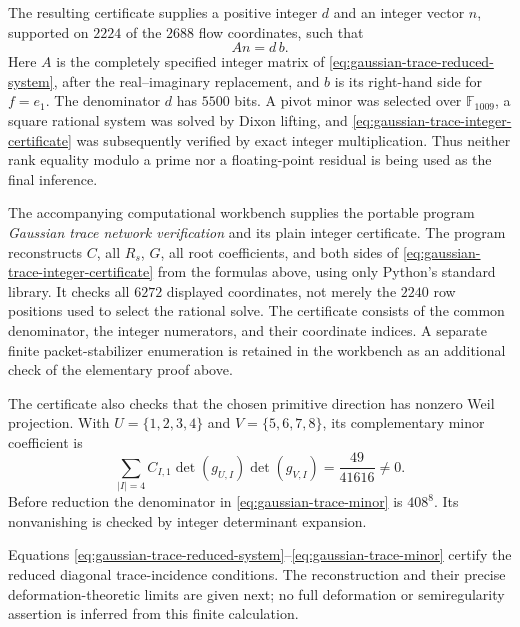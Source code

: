 The resulting certificate supplies a positive integer \(d\) and an integer
vector \(n\), supported on \(2224\) of the \(2688\) flow coordinates,
such that
\begin{equation}
 A n=d\,b.
 \label{eq:gaussian-trace-integer-certificate}
\end{equation}
Here \(A\) is the completely specified integer matrix of \eqref{eq:gaussian-trace-reduced-system}, after
the real--imaginary replacement, and \(b\) is its right-hand side for
\(f=e_1\).  The denominator \(d\) has \(5500\) bits.  A pivot minor
was selected over \(\mathbb F_{1009}\), a square rational system was
solved by Dixon lifting, and \eqref{eq:gaussian-trace-integer-certificate} was subsequently verified by exact
integer multiplication.  Thus neither rank equality modulo a prime
nor a floating-point residual is being used as the final inference.

The accompanying computational workbench supplies the portable
program \emph{Gaussian trace network verification} and its plain
integer certificate.  The program reconstructs \(C\),
all \(R_s\), \(G\), all root coefficients, and both sides of \eqref{eq:gaussian-trace-integer-certificate}
from the formulas above, using only Python's standard library.
It checks all \(6272\) displayed coordinates, not merely the
\(2240\) row positions used to select the rational solve.  The
certificate consists of the common denominator, the integer
numerators, and their coordinate indices.  A separate finite
packet-stabilizer enumeration is retained in the workbench as
an additional check of the elementary proof above.

The certificate also checks that the chosen primitive direction has
nonzero Weil projection.  With \(U=\{1,2,3,4\}\) and
\(V=\{5,6,7,8\}\), its complementary minor coefficient is
\begin{equation}
 \sum_{|I|=4}C_{I,1}\det(g_{U,I})\det(g_{V,I})
 =
 \frac{49}{41616}\ne0.
 \label{eq:gaussian-trace-minor}
\end{equation}
Before reduction the denominator in \eqref{eq:gaussian-trace-minor} is \(408^8\).  Its
nonvanishing is checked by integer determinant expansion.

Equations \eqref{eq:gaussian-trace-reduced-system}--\eqref{eq:gaussian-trace-minor} certify the reduced diagonal trace-incidence
conditions.  The reconstruction and their precise deformation-theoretic
limits are given next; no full deformation or semiregularity assertion
is inferred from this finite calculation.


